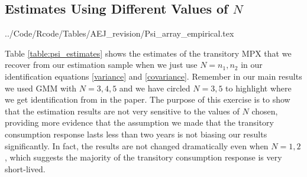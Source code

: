 \documentclass[titlepage]{\econtex}\newcommand{\texname}{ConsumptionHeterogeneity}
\newcommand{\tabdir}{../Code/Rcode/Tables/AEJ_revision}
\begin{document}
	\subsection{Estimates Using Different Values of $N$}
	\begin{center}
		\label{table:psi_estimates}
		 \tabdir/Psi_array_empirical.tex
	\end{center}
	Table \ref{table:psi_estimates} shows the estimates of the transitory MPX that we recover from our estimation sample when we just use $N=n_1,n_2$ in our identification equations \ref{variance} and \ref{covariance}. Remember in our main results we used GMM with $N=3,4,5$ and we have circled $N=3,5$ to highlight where we get identification from in the paper. The purpose of this exercise is to show that the estimation results are not very sensitive to the values of $N$ chosen, providing more evidence that the assumption we made that the transitory consumption response lasts less than two years is not biasing our results significantly. In fact, the results are not changed dramatically even when $N=1,2$, which suggests the majority of the transitory consumption response is very short-lived.
	
\end{document}
